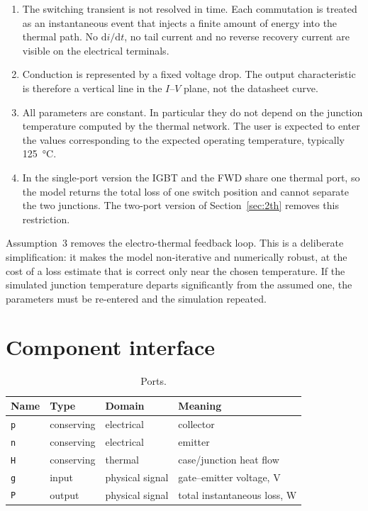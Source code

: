 \documentclass[11pt,a4paper]{article}
\newcommand{\code}[1]{\texttt{\small #1}}
\begin{document}
\begin{enumerate}
  \item The switching transient is not resolved in time. Each commutation is
        treated as an instantaneous event that injects a finite amount of energy
        into the thermal path. No $\mathrm{d}i/\mathrm{d}t$, no tail current and
        no reverse recovery current are visible on the electrical terminals.
  \item Conduction is represented by a fixed voltage drop. The output
        characteristic is therefore a vertical line in the $I$--$V$ plane, not
        the datasheet curve.
  \item All parameters are constant. In particular they do not depend on the
        junction temperature computed by the thermal network. The user is
        expected to enter the values corresponding to the expected operating
        temperature, typically \SI{125}{\degreeCelsius}.
  \item In the single-port version the IGBT and the FWD share one thermal
        port, so the model returns the total loss of one switch position and
        cannot separate the two junctions. The two-port version of
        Section~\ref{sec:2th} removes this restriction.
\end{enumerate}

Assumption~3 removes the electro-thermal feedback loop. This is a deliberate
simplification: it makes the model non-iterative and numerically robust, at the
cost of a loss estimate that is correct only near the chosen temperature. If the
simulated junction temperature departs significantly from the assumed one, the
parameters must be re-entered and the simulation repeated.

\section{Component interface}

\begin{table}[h]
\centering
\caption{Ports.}
\begin{tabular}{llll}
\toprule
Name & Type & Domain & Meaning \\
\midrule
\code{p} & conserving & electrical & collector \\
\code{n} & conserving & electrical & emitter \\
\code{H} & conserving & thermal & case/junction heat flow \\
\code{g} & input & physical signal & gate--emitter voltage, \si{\volt} \\
\code{P} & output & physical signal & total instantaneous loss, \si{\watt} \\
\bottomrule
\end{tabular}
\end{table}
\end{document}

